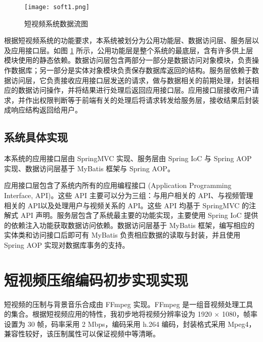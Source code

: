 \begin{figure}[!ht]
    \centering
    \texttt{[image: soft1.png]}
    \caption{短视频系统数据流图}
    \label{figs:soft1}
\end{figure}

根据短视频系统的功能要求，本系统被划分为公用功能层、数据访问层、服务层以及应用接口层。如图 \ref{figs:soft1} 所示，公用功能层是整个系统的最底层，含有许多供上层模块使用的静态依赖。数据访问层包含两部分一部分是数据访问对象模块，负责操作数据库；另一部分是实体对象模块负责保存数据库返回的结构。服务层依赖于数据访问层，它负责接收应用接口层发送的请求，做与数据相关的前期处理，封装相应的数据访问操作，并将结果进行处理后返回应用接口层。应用接口层接收用户请求，并作出权限判断等于前端有关的处理后将请求转发给服务层，接收结果后封装成响应结构返回给用户。

\subsection{系统具体实现}
本系统的应用接口层由 SpringMVC 实现、服务层由 Spring IoC 与 Spring AOP 实现、数据访问层基于 MyBatis 框架与 Spring AOP。

应用接口层包含了系统内所有的应用编程接口 (Application Programming Interface, API)。这些 API 主要可以分为三组：与用户相关的 API、与视频管理相关的 API以及处理用户与视频关系的 API。这些 API 均基于 SpringMVC 的注解式 API 声明。服务层包含了系统最主要的功能实现，主要使用 Spring IoC 提供的依赖注入功能获取数据访问依赖。数据访问层基于 MyBatis 框架，编写相应的实体类和访问接口后即可有 MyBatis 负责相应数据的读取与封装，并且使用 Spring AOP 实现对数据库事务的支持。



\section{短视频压缩编码初步实现实现}

短视频的压制与背景音乐合成由 FFmpeg\cite{ffmpeg2019} 实现。FFmpeg 是一组音视频处理工具的集合。根据短视频应用的特性，我初步地将视频分辨率设为 1920 $\times$ 1080，帧率设置为 30 帧，码率采用 2 Mbps，编码采用 h.264 编码，封装格式采用 Mpeg4，兼容性较好，该压制属性可以保证视频中等清晰。




